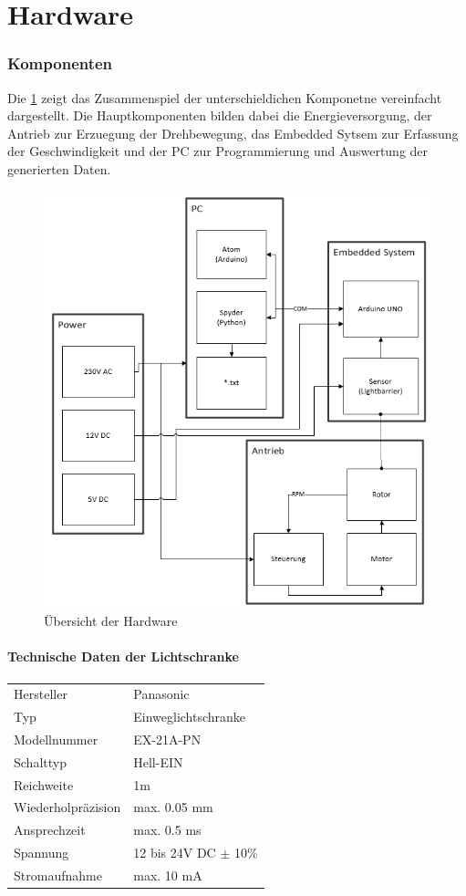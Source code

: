 \part{Hardware}
\section{Komponenten}
Die \ref{fig:UebHardware} zeigt das Zusammenspiel der unterschieldichen Komponetne vereinfacht dargestellt. Die Hauptkomponenten bilden dabei die Energieversorgung, der Antrieb zur Erzuegung der Drehbewegung, das Embedded Sytsem zur Erfassung der Geschwindigkeit und der PC zur Programmierung und Auswertung der generierten Daten.
\begin{figure}[ht]
    \centering
    \includegraphics[width=\textwidth]{images/UebersichtVisio}
    \caption{Übersicht der Hardware}
    \label{fig:UebHardware}
\end{figure}
\subsection{Technische Daten der Lichtschranke}
\null{}
\begin{tabular}{ll}
    Hersteller & Panasonic\\
    Typ & Einweglichtschranke\\
    Modellnummer &  EX-21A-PN \\
    Schalttyp & Hell-EIN\\
    Reichweite & 1m\\
    Wiederholpräzision & max. 0.05 mm\\
    Ansprechzeit & max. 0.5 ms\\
    Spannung & 12 bis 24V DC $\pm$ 10\% \\
    Stromaufnahme & max. 10 mA
\end{tabular}
\\\null\\

